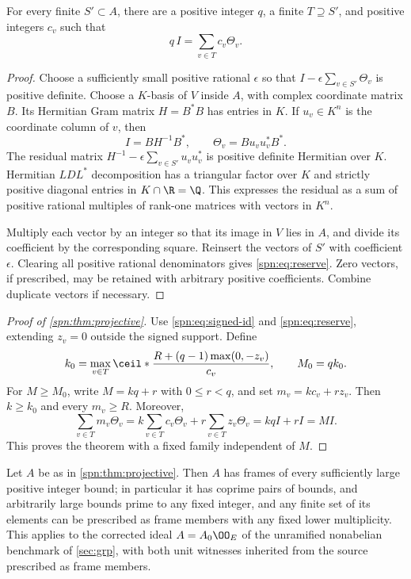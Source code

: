 \begin{lemma}\label{spn:lem:reserve}
For every finite $S'\subset A$, there are a positive integer $q$, a finite
$T\supseteq S'$, and positive integers $c_v$ such that
\begin{equation}\label{spn:eq:reserve}
 q\,I=\sum_{v\in T}c_v\Theta_v .
\end{equation}
\end{lemma}

\begin{proof}
Choose a sufficiently small positive rational $\epsilon$ so that
$I-\epsilon\sum_{v\in S'}\Theta_v$ is positive definite. Choose a $K$-basis of
$V$ inside $A$, with complex coordinate matrix $B$. Its Hermitian Gram matrix
$H=B^*B$ has entries in $K$. If $u_v\in K^n$ is the coordinate column of $v$,
then
\[
 I=BH^{-1}B^*,\qquad\Theta_v=Bu_vu_v^*B^* .
\]
The residual matrix $H^{-1}-\epsilon\sum_{v\in S'}u_vu_v^*$ is positive
definite Hermitian over $K$. Hermitian $LDL^*$ decomposition has a triangular
factor over $K$ and strictly positive diagonal entries in $K\cap\R=\Q$. This
expresses the residual as a sum of positive rational multiples of rank-one
matrices with vectors in $K^n$.

Multiply each vector by an integer so that its image in $V$ lies in $A$, and
divide its coefficient by the corresponding square. Reinsert the vectors of
$S'$ with coefficient $\epsilon$. Clearing all positive rational denominators
gives \eqref{spn:eq:reserve}. Zero vectors, if prescribed, may be retained
with arbitrary positive coefficients. Combine duplicate vectors if necessary.
\end{proof}

\begin{proof}[Proof of \cref{spn:thm:projective}]
Use \eqref{spn:eq:signed-id} and \eqref{spn:eq:reserve}, extending $z_v=0$
outside the signed support. Define
\begin{equation}\label{spn:eq:explicit-threshold}
 k_0=\max_{v\in T}\ceil*{\frac{R+(q-1)\max(0,-z_v)}{c_v}},\qquad M_0=qk_0 .
\end{equation}
For $M\ge M_0$, write $M=kq+r$ with $0\le r<q$, and set $m_v=kc_v+rz_v$. Then
$k\ge k_0$ and every $m_v\ge R$. Moreover,
\[
 \sum_{v\in T}m_v\Theta_v=k\sum_{v\in T}c_v\Theta_v+r\sum_{v\in T}z_v\Theta_v
 =kqI+rI=MI .
\]
This proves the theorem with a fixed family independent of $M$.
\end{proof}

\begin{corollary}\label{spn:cor:coprime}
Let $A$ be as in \cref{spn:thm:projective}. Then $A$ has frames of every
sufficiently large positive integer bound; in particular it has coprime pairs
of bounds, and arbitrarily large bounds prime to any fixed integer, and any
finite set of its elements can be prescribed as frame members with any fixed
lower multiplicity. This applies to the corrected ideal $A=A_0\OO_E$ of the
unramified nonabelian benchmark of \cref{sec:grp}, with both unit witnesses
inherited from the source prescribed as frame members.
\end{corollary}

